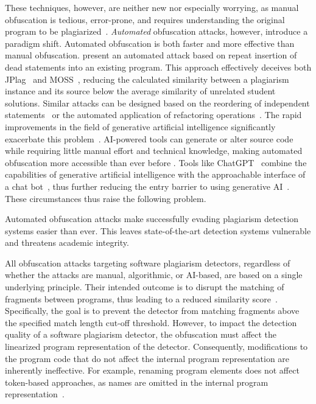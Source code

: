 These techniques, however, are neither new nor especially worrying, as manual obfuscation is tedious, error-prone, and requires understanding the original program to be plagiarized~\cite{Joy1999}.
\textit{Automated} obfuscation attacks, however, introduce a paradigm shift. Automated obfuscation is both faster and more effective than manual obfuscation.
\citet{DevoreMcDonald2020} present an automated attack based on repeat insertion of dead statements into an existing program.
This approach effectively deceives both JPlag~\cite{prechelt2002} and MOSS~\cite{MOSS}, reducing the calculated similarity between a plagiarism instance and its source below the average similarity of unrelated student solutions.
Similar attacks can be designed based on the reordering of independent statements~\cite{Broedel2023} or the automated application of refactoring operations~\cite{Maisch2024}. 
The rapid improvements in the field of generative artificial intelligence significantly exacerbate this problem~\cite{Lancaster2023}.
AI-powered tools can generate or alter source code~\cite{Camara2023, Daun2023} while requiring little manual effort and technical knowledge, making automated obfuscation more accessible than ever before \cite{Biderman2022, Khalil_Er_2023}. Tools like ChatGPT~\cite{ChatGPT} combine the capabilities of generative artificial intelligence with the approachable interface of a chat bot~\cite{Saglam2024a}, thus further reducing the entry barrier to using generative AI~\cite{ChatGPTGuide}.
These circumstances thus raise the following problem.
%
    \begin{problem}\label{problem1}
    Automated obfuscation attacks make successfully evading plagiarism detection systems easier than ever. This leaves state-of-the-art detection systems vulnerable and threatens academic integrity.
    \end{problem}
%
All obfuscation attacks targeting software plagiarism detectors, regardless of whether the attacks are manual, algorithmic, or AI-based, are based on a single underlying principle.
%
Their intended outcome is to disrupt the matching of fragments between programs, thus leading to a reduced similarity score~\cite{DevoreMcDonald2020}.
Specifically, the goal is to prevent the detector from matching fragments above the specified match length cut-off threshold.
However, to impact the detection quality of a software plagiarism detector, the obfuscation must affect the linearized program representation of the detector. Consequently, modifications to the program code that do not affect the internal program representation are inherently ineffective. For example, renaming program elements does not affect token-based approaches, as names are omitted in the internal program representation~\cite{prechelt2000, Saglam2024a}.
